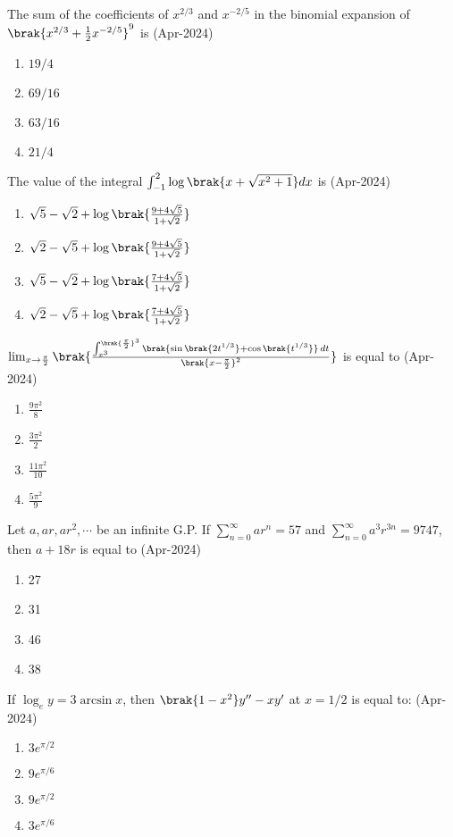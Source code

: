 \item The sum of the coefficients of $x^{2/3}$ and $x^{-2/5}$ in the binomial expansion of $\brak{x^{2/3}+\frac{1}{2}x^{-2/5}}^9$ is \hfill(Apr-2024)
\begin{enumerate}
    \item $19/4$
    \item $69/16$
    \item $63/16$
    \item $21/4$
\end{enumerate}
\item The value of the integral $\int_{-1}^{2} \log{\brak{x + \sqrt{x^{2}+1}}} dx$ is \hfill(Apr-2024)
\begin{enumerate}
    \item $\sqrt{5}-\sqrt{2}+\log{\brak{\frac{9+4\sqrt{5}}{1+\sqrt{2}}}}$
    \item $\sqrt{2}-\sqrt{5}+\log{\brak{\frac{9+4\sqrt{5}}{1+\sqrt{2}}}}$
    \item $\sqrt{5}-\sqrt{2}+\log{\brak{\frac{7+4\sqrt{5}}{1+\sqrt{2}}}}$
    \item $\sqrt{2}-\sqrt{5}+\log{\brak{\frac{7+4\sqrt{5}}{1+\sqrt{2}}}}$
\end{enumerate}
\item $\lim_{x \to \frac{\pi}{2}} \brak{ \frac{\int_{x^3}^{\brak{ \frac{\pi}{2} }^3} \brak{ \sin \brak{ 2t^{1/3} } + \cos \brak{ t^{1/3} } } \, dt }{\brak{x - \frac{\pi}{2}}^2} }$ is equal to \hfill(Apr-2024)
\begin{enumerate}
    \item $\frac{9\pi^2}{8}$
    \item $\frac{3\pi^2}{2}$
    \item $\frac{11\pi^2}{10}$
    \item $\frac{5\pi^2}{9}$
\end{enumerate}
\item Let $a,ar,ar^2,\cdots$ be an infinite G.P. If $\sum_{n=0}^{\infty}ar^n=57$ and $\sum_{n=0}^{\infty}a^3r^{3n}=9747$, then $a+18r$ is equal to \hfill(Apr-2024)
\begin{enumerate}
	\item 27
	\item 31
	\item 46
	\item 38
\end{enumerate}
\item If $\log_e y = 3\arcsin{x}$, then $\brak{1-x^2}y^{\prime\prime}-xy^{\prime}$ at $x = 1/2$ is equal to: \hfill(Apr-2024)
\begin{enumerate}
    \item $3e^{\pi/2}$
    \item $9e^{\pi/6}$
    \item $9e^{\pi/2}$
    \item $3e^{\pi/6}$
\end{enumerate}
